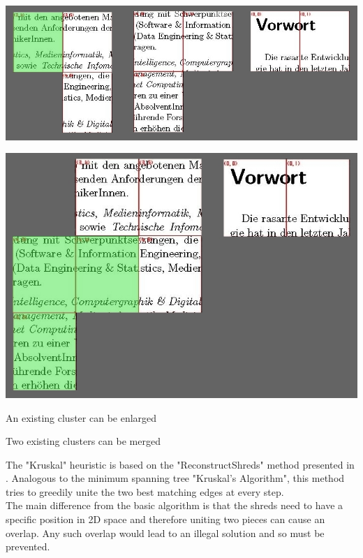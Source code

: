\documentclass[portrait,final,a0paper,fontscale=0.277]{baposter}
\begin{document}
\begin{poster}
{\begin{minipage}[t]{0.98\linewidth}
        \begin{minipage}[c]{0.56\linewidth}
                \centering
                \includegraphics[width=\textwidth]{kruskalS3Grey}
        \end{minipage}
        \begin{minipage}[c]{0.42\linewidth}
                \centering
                \includegraphics[width=\textwidth]{kruskalS4Grey}
        \end{minipage}

        \begin{minipage}[t]{0.56\linewidth}
                \centering
                \smaller An existing cluster can be enlarged
        \end{minipage}
        \begin{minipage}[t]{0.42\linewidth}
                \centering
                \smaller Two existing clusters can be merged
        \end{minipage}
    \end{minipage}

    \begin{minipage}[t]{0.98\linewidth}
    \vspace{1em}
     	\raggedright The "Kruskal" heuristic is based on the "ReconstructShreds" method presented in \cite{P1}. Analogous to the minimum spanning tree "Kruskal's Algorithm", this method tries to greedily unite the two best matching edges at every step. \\ The main difference from the basic algorithm is that the shreds need to have a specific position in 2D space and therefore uniting two pieces can cause an overlap. Any such overlap would lead to an illegal solution and so must be prevented.
    \end{minipage}
}


\end{poster}
\end{document}
